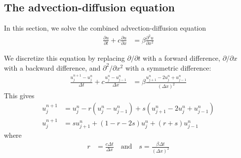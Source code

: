 \documentclass[twocolumn]{myarticle}
\begin{document}
\subsection{The advection-diffusion equation}
\label{subsec:the_advection_diffusion_equation}

In this section, we solve the combined advection-diffusion equation
\begin{align}
    \frac{\partial u}{\partial t} + c \frac{\partial u}{\partial x} &= \beta \frac{\partial^2 u}{\partial x^2}
\end{align}

We discretize this equation by replacing $ \partial/\partial t $ with a forward difference, $ \partial/\partial x $ with a backward difference, and $ \partial^2/\partial x^2 $ with a symmetric difference:
\begin{align}
    \frac{u^{n+1}_j - u^n_j}{\Delta t} + c \frac{u^n_j - u^n_{j-1}}{\Delta x} &= \beta \frac{u^n_{j+1} - 2 u^n_j + u^n_{j-1}}{(\Delta x)^2}
\end{align}
This gives
\begin{align}
    u^{n+1}_j &= u^n_j - r \left(u^n_j - u^n_{j-1}\right) + s \left(u^n_{j+1} - 2 u^n_j + u^n_{j-1} \right)
    \\
    u^{n+1}_j &= s u^n_{j+1} + (1 - r - 2s) u^n_j + (r + s) u^n_{j-1}
\end{align}
where
\begin{align}
    r &= \frac{c \Delta t}{\Delta x} \quad \text{and} \quad s = \frac{\beta \Delta t}{(\Delta x)^2}
\end{align}
\end{document}
